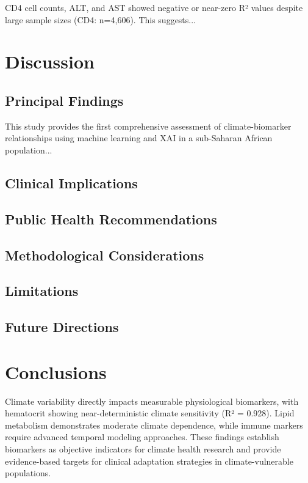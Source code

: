 \documentclass[11pt,a4paper]{article}
\begin{document}
CD4 cell counts, ALT, and AST showed negative or near-zero R² values despite large sample sizes (CD4: n=4,606). This suggests...

\section{Discussion}

\subsection{Principal Findings}

This study provides the first comprehensive assessment of climate-biomarker relationships using machine learning and XAI in a sub-Saharan African population...


\subsection{Clinical Implications}

\subsection{Public Health Recommendations}

\subsection{Methodological Considerations}

\subsection{Limitations}

\subsection{Future Directions}

\section{Conclusions}

Climate variability directly impacts measurable physiological biomarkers, with hematocrit showing near-deterministic climate sensitivity (R² = 0.928). Lipid metabolism demonstrates moderate climate dependence, while immune markers require advanced temporal modeling approaches. These findings establish biomarkers as objective indicators for climate health research and provide evidence-based targets for clinical adaptation strategies in climate-vulnerable populations.
\end{document}
